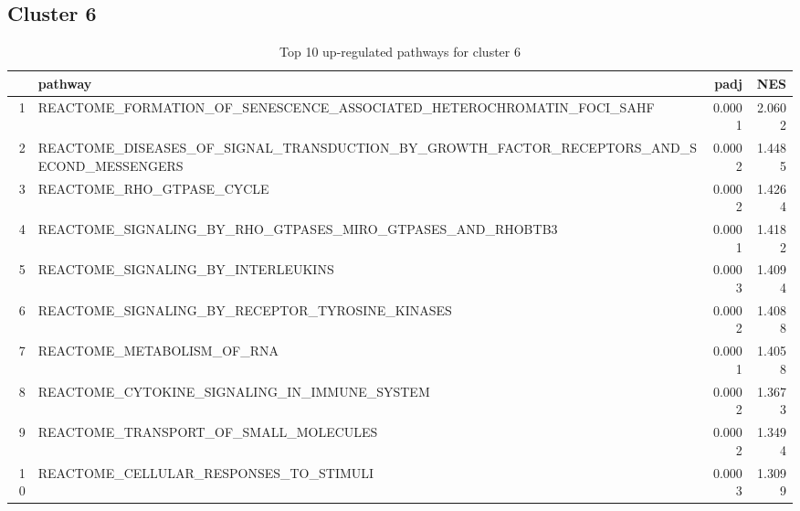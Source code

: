 \documentclass{article}
\begin{document}
\subsection{Cluster 6 }
\begin{table}[H]
\centering
\begin{tabularx}{\textwidth}{rlrr}
  \hline
 & pathway & padj & NES \\ 
  \hline
1 & REACTOME\_FORMATION\_OF\_SENESCENCE\_ASSOCIATED\_HETEROCHROMATIN\_FOCI\_SAHF & 0.0001 & 2.0602 \\ 
  2 & REACTOME\_DISEASES\_OF\_SIGNAL\_TRANSDUCTION\_BY\_GROWTH\_FACTOR\_RECEPTORS\_AND\_SECOND\_MESSENGERS & 0.0002 & 1.4485 \\ 
  3 & REACTOME\_RHO\_GTPASE\_CYCLE & 0.0002 & 1.4264 \\ 
  4 & REACTOME\_SIGNALING\_BY\_RHO\_GTPASES\_MIRO\_GTPASES\_AND\_RHOBTB3 & 0.0001 & 1.4182 \\ 
  5 & REACTOME\_SIGNALING\_BY\_INTERLEUKINS & 0.0003 & 1.4094 \\ 
  6 & REACTOME\_SIGNALING\_BY\_RECEPTOR\_TYROSINE\_KINASES & 0.0002 & 1.4088 \\ 
  7 & REACTOME\_METABOLISM\_OF\_RNA & 0.0001 & 1.4058 \\ 
  8 & REACTOME\_CYTOKINE\_SIGNALING\_IN\_IMMUNE\_SYSTEM & 0.0002 & 1.3673 \\ 
  9 & REACTOME\_TRANSPORT\_OF\_SMALL\_MOLECULES & 0.0002 & 1.3494 \\ 
  10 & REACTOME\_CELLULAR\_RESPONSES\_TO\_STIMULI & 0.0003 & 1.3099 \\ 
   \hline
\end{tabularx}
\caption{Top 10 up-regulated pathways for cluster 6} 
\label{tab:q3_2_6}
\end{table}
\end{document}
